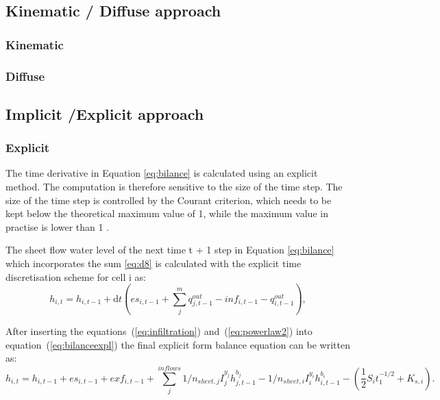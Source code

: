  

    \subsection{Kinematic / Diffuse approach}

        \subsubsection{Kinematic}
        \subsubsection{Diffuse}

    \FloatBarrier
    \subsection{Implicit /Explicit approach}

        \subsubsection{Explicit}
            The time derivative in Equation \ref{eq:bilance} is calculated using an
            explicit method. The computation is therefore sensitive to the size of the time
            step. The size of the time step is controlled by the Courant criterion, which
            needs to be kept below the theoretical maximum value of 1, while the maximum
            value in practise is lower than 1 
            \cite{zhang1989modeling, esteves2000overland}.


            The sheet flow water level of the next time t + 1 step in Equation
            \ref{eq:bilance} which incorporates the sum \ref{eq:d8} is calculated with the
            explicit time discretisation scheme for cell i as:
            \begin{equation} 
            h_{i,t} =h_{i,t-1} + \mathrm{d}t (es_{i,t-1} + \sum_j^m q^{out}_{j,t-1}-
            inf_{i,t-1} - q^{out}_{i,t-1}),
            \label{eq:bilanceexpl}
            \end{equation}


           After inserting the equations~(\ref{eq:infiltration})
           and~(\ref{eq:powerlaw2}) into equation~(\ref{eq:bilanceexpl}) the
           final explicit form balance equation can be written as:
            \begin{dmath}
              h_{i,t} = h_{i,t-1} +
              es_{i,t-1}  + exf_{i,t-1} +  \sum_{j}^{inflows}
              1/n_{sheet,j}I_j^{y_j} h_{j,t-1}^{b_j} -
              1/n_{sheet,i}I_i^{y_i}h_{i,t-1}^{b_i} - ( 
              \frac{1}{2}S_it_1^{-1/2}+K_{s,i}).
            \end{dmath}


